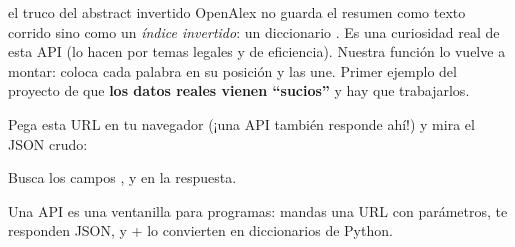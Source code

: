 \documentclass[11pt,a4paper]{article}
\begin{document}
\begin{concepto}{el truco del abstract invertido}
OpenAlex no guarda el resumen como texto corrido sino como un \emph{índice invertido}:
un diccionario . Es una curiosidad real de
esta API (lo hacen por temas legales y de eficiencia). Nuestra función
 lo vuelve a montar: coloca cada palabra en su posición
y las une. Primer ejemplo del proyecto de que \textbf{los datos reales vienen ``sucios''}
y hay que trabajarlos.
\end{concepto}

\begin{practica}
Pega esta URL en tu navegador (¡una API también responde ahí!) y mira el JSON crudo:
\begin{center}
\small{}
\end{center}
Busca los campos ,  y
 en la respuesta.
\end{practica}

\begin{resumen}
Una API es una ventanilla para programas: mandas una URL con parámetros, te responden
JSON, y  +  lo convierten en diccionarios de Python.
\end{resumen}
\end{document}
